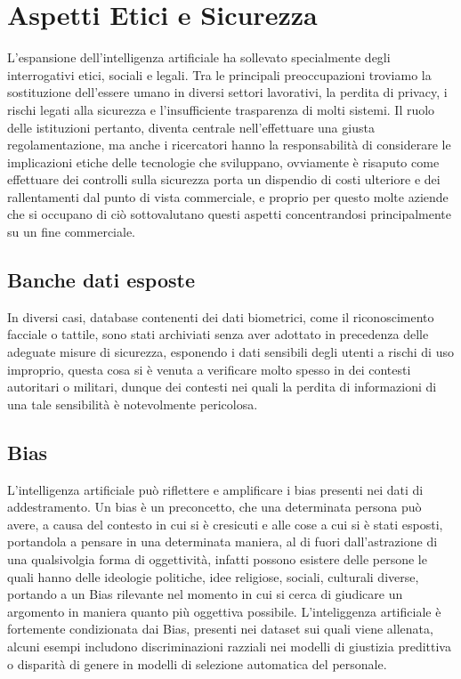 \section{Aspetti Etici e Sicurezza}

L'espansione dell'intelligenza artificiale ha sollevato specialmente degli interrogativi etici, sociali e legali. Tra le principali preoccupazioni troviamo la sostituzione dell’essere umano in diversi settori lavorativi, la perdita di privacy, i rischi legati alla sicurezza e l’insufficiente trasparenza di molti sistemi. Il ruolo delle istituzioni pertanto, diventa centrale nell'effettuare una giusta regolamentazione, ma anche i ricercatori hanno la responsabilità di considerare le implicazioni etiche delle tecnologie che sviluppano, ovviamente è risaputo come effettuare dei controlli sulla sicurezza porta un dispendio di costi ulteriore e dei rallentamenti dal punto di vista commerciale, e proprio per questo molte aziende che si occupano di ciò sottovalutano questi aspetti concentrandosi principalmente su un fine commerciale.

\subsection{Banche dati esposte}

In diversi casi, database contenenti dei dati biometrici, come il riconoscimento facciale o tattile, sono stati archiviati senza aver adottato in precedenza delle adeguate misure di sicurezza, esponendo i dati sensibili degli utenti a rischi di uso improprio, questa cosa si è venuta a verificare molto spesso in dei contesti autoritari o militari, dunque dei contesti nei quali la perdita di informazioni di una tale sensibilità è notevolmente pericolosa.

\subsection{Bias}

L’intelligenza artificiale può riflettere e amplificare i bias presenti nei dati di addestramento. Un bias è un preconcetto, che una determinata persona può avere, a causa del contesto in cui si è cresicuti e alle cose a cui si è stati esposti, portandola a pensare in una determinata maniera, al di fuori dall'astrazione di una qualsivolgia forma di oggettività, infatti possono esistere delle persone le quali hanno delle ideologie politiche, idee religiose, sociali, culturali diverse, portando a un Bias rilevante nel momento in cui si cerca di giudicare un argomento in maniera quanto più oggettiva possibile. L'inteliggenza artificiale è fortemente condizionata dai Bias, presenti nei dataset sui quali viene allenata, alcuni esempi includono discriminazioni razziali nei modelli di giustizia predittiva o disparità di genere in modelli di selezione automatica del personale.

